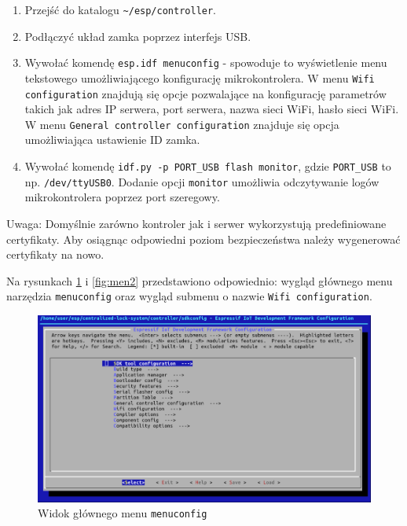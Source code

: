         \begin{enumerate}
            \item Przejść do katalogu \texttt{\~{}/esp/controller}.
            \item Podłączyć układ zamka poprzez interfejs USB.
            \item Wywołać komendę \texttt{esp.idf menuconfig} - spowoduje to wyświetlenie menu tekstowego umożliwiającego konfigurację mikrokontrolera. W menu \texttt{Wifi configuration} znajdują się opcje pozwalające na konfigurację parametrów takich jak adres IP serwera, port serwera, nazwa sieci WiFi, hasło sieci WiFi. W menu \texttt{General controller configuration} znajduje się opcja umożliwiająca ustawienie ID zamka.
            \item Wywołać komendę \texttt{idf.py -p PORT\_USB flash monitor}, gdzie \texttt{PORT\_USB} to np. \texttt{/dev/ttyUSB0}. Dodanie opcji \texttt{monitor} umożliwia odczytywanie logów mikrokontrolera poprzez port szeregowy.
        \end{enumerate}

        Uwaga: Domyślnie zarówno kontroler jak i serwer wykorzystują predefiniowane certyfikaty. Aby osiągnąc odpowiedni poziom bezpieczeństwa należy wygenerować certyfikaty na nowo.

        Na rysunkach \ref{fig:men1} i \ref{fig:men2} przedstawiono odpowiednio: wygląd głównego menu narzędzia \texttt{menuconfig} oraz wygląd submenu o nazwie \texttt{Wifi configuration}.

        \begin{figure}[]
            \centering
            \includegraphics[width=\textwidth]{chapters/images/menuconfig1.png}
            \caption{Widok głównego menu \texttt{menuconfig}}
            \label{fig:men1}
        \end{figure}

